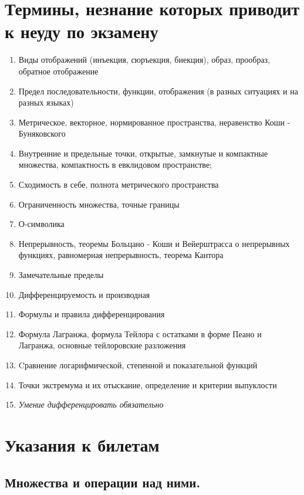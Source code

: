 \documentclass[12pt, a4paper]{article}
\begin{document}
\section{Термины, незнание которых приводит к неуду по экзамену}

\begin{enumerate}
    \item Виды отображений (инъекция, сюръекция, биекция), образ, прообраз, обратное отображение
    \item Предел последовательности, функции, отображения  (в разных ситуациях и на разных языках)
    \item Метрическое, векторное, нормированное пространства, неравенство Коши - Буняковского
    \item Внутренние и предельные точки, открытые, замкнутые и компактные множества, компактность в евклидовом пространстве;
    \item Сходимость в себе, полнота метрического пространства
    \item Ограниченность множества, точные границы
    \item О-символика
    \item Непрерывность, теоремы Больцано - Коши и Вейерштрасса о непрерывных функциях, равномерная непрерывность, теорема Кантора
    \item Замечательные пределы
    \item Дифференцируемость и производная
    \item Формулы и правила дифференцирования
    \item Формула Лагранжа, формула Тейлора с остатками в форме Пеано и Лагранжа, основные тейлоровские разложения
    \item Cравнение логарифмической, степенной и показательной функций
    \item Точки экстремума и их отыскание, определение и критерии выпуклости
    \item \textit{Умение дифференцировать обязательно}
\end{enumerate}

\section{Указания к билетам}



\subsection{Множества и операции над ними.}
\end{document}
